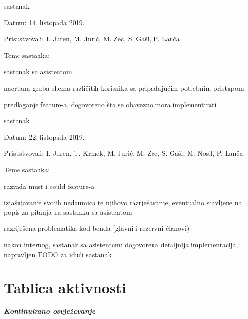 \begin{packed_enum}
			\item  sastanak
			\item[] \begin{packed_item}
				\item Datum: 14. listopada 2019.
				\item Prisustvovali: I. Juren, M. Jurić, M. Zec, S. Gaši, P. Lanča
				\item Teme sastanka:
				\begin{packed_item}
					\item  sastanak sa asistentom
					\item  nacrtana gruba shema različitih korisnika sa pripadajućim potrebnim pristupom
					\item  predlaganje feature-a, dogovoreno što se obavezno mora implementirati 
				\end{packed_item}
			\end{packed_item}
			
			\item  sastanak
			\item[] \begin{packed_item}
				\item Datum: 22. listopada 2019.
				\item Prisustvovali: I. Juren, T. Krmek, M. Jurić, M. Zec, S. Gaši, M. Nosil, P. Lanča
				\item Teme sastanka:
				\begin{packed_item}
					\item  razrada must i could feature-a
					\item  izjašnjavanje svojih nedoumica te njihovo razrješavanje, eventualno stavljene na popis za pitanja na sastanku sa asistentom
					\item  razriješena problematika kod benda (glavni i rezervni članovi)
					\item  nakon internog, sastanak sa asistentom: dogovorena detaljnija implementacija, napravljen TODO za idući sastanak
				\end{packed_item}
			\end{packed_item}
			
			
		\end{packed_enum}
		
		\eject
		\section*{Tablica aktivnosti}
		
			\textbf{\textit{Kontinuirano osvježavanje}}\\
			
